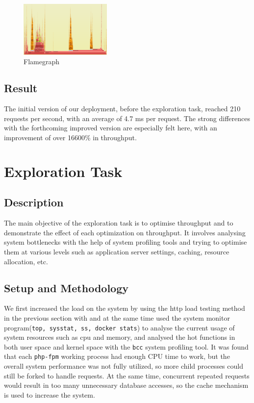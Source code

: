 \begin{figure}
\centering 
\includegraphics[width=0.4\textwidth]{benchmark/res/bccprofile.png}
\caption{Flamegraph} 
\label{flamegraph}
\end{figure}

\subsection{Result}
The initial version of our deployment, before the exploration task, reached 210 requests per second, with an average of 4.7 ms per request. The strong differences with the forthcoming improved version are especially felt here, with an improvement of over 16600\% in throughput.
\section{Exploration Task}

\subsection{Description}

The main objective of the exploration task is to optimise throughput and to demonstrate the effect of each optimization on throughput. It involves analysing system bottlenecks with the help of system profiling tools and trying to optimise them at various levels such as application server settings, caching, resource allocation, etc.

\subsection{Setup and Methodology}

We first increased the load on the system by using the http load testing method in the previous section with  and at the same time used the system monitor program(\texttt{top, sysstat, ss, docker stats}) to analyse the current usage of system resources such as cpu and memory, and analysed the hot functions in both user space and kernel space with the \texttt{bcc} system profiling tool. It was found that each \texttt{php-fpm} working process had enough CPU time to work, but the overall system performance was not fully utilized, so more child processes could still be forked to handle requests. At the same time, concurrent repeated requests would result in too many unnecessary database accesses, so the cache mechanism is used to increase the system.

